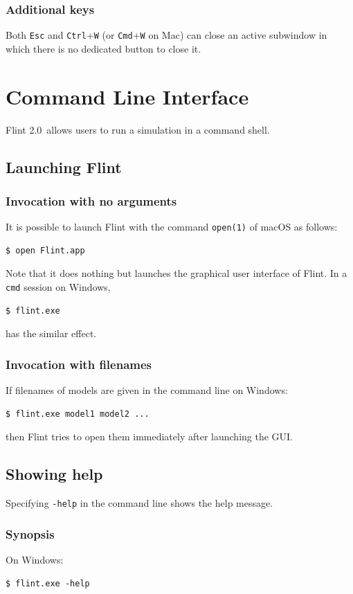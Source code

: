 \documentclass[a4paper,10pt]{report}
\def\FlintVersion{2.0}
\def\Flint{Flint \FlintVersion}
\begin{document}
\subsection{Additional keys}
Both {\tt Esc} and {\tt Ctrl}+{\tt W} (or {\tt Cmd}+{\tt W} on Mac) can close an active
subwindow in which there is no dedicated button to close it.


\chapter{Command Line Interface}
\Flint\ allows users to run a simulation in a command shell.

\section{Launching Flint}

\subsection{Invocation with no arguments}
It is possible to launch Flint with the command {\tt open(1)} of macOS as follows:
\begin{verbatim}
$ open Flint.app
\end{verbatim}
Note that it does nothing but launches the graphical user interface of Flint.
In a {\tt cmd} session on Windows,
\begin{verbatim}
$ flint.exe
\end{verbatim}
has the similar effect.

\subsection{Invocation with filenames}
If filenames of models are given in the command line on Windows:
\begin{verbatim}
$ flint.exe model1 model2 ...
\end{verbatim}
then Flint tries to open them immediately after launching the GUI.

\section{Showing help}
Specifying {\tt -help} in the command line shows the help message.

\subsection{Synopsis}
On Windows:
\begin{verbatim}
$ flint.exe -help
\end{verbatim}
\end{document}
